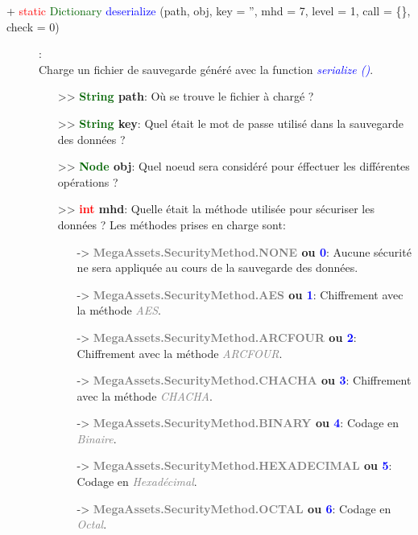 \documentclass[a4paper, 11pt]{article}
\begin{document}
	\begin{description}
		\item [+ \textcolor{red}{static} \textcolor{darkgreen}{Dictionary} \textcolor{blue}{deserialize} 
		(path, obj, key = '', mhd = 7, level = 1, call = \{\}, check = 0)]: \\Charge un fichier de
		sauvegarde généré avec la function \textit{\textcolor{blue}{\textit{serialize ()}}}.
		\begin{itemize}
			\item [>> \textbf{\textcolor{darkgreen}{String} path}:] Où se trouve le fichier à chargé ?
			\item [>> \textbf{\textcolor{darkgreen}{String} key}:] Quel était le mot de passe utilisé dans 
			la sauvegarde des données ?
			\item [>> \textbf{\textcolor{darkgreen}{Node} obj}:] Quel noeud sera considéré pour éffectuer
			les différentes opérations ?
			\item [>> \textbf{\textcolor{red}{int} mhd}:] Quelle était la méthode utilisée pour sécuriser 
			les données ? Les méthodes prises en charge sont:
			\begin{itemize}
				\item [-> \textbf{\textcolor{gray}{MegaAssets.SecurityMethod.NONE} ou \textcolor{blue}{0}}:] 
				Aucune sécurité ne sera appliquée au cours de la sauvegarde des données.
				\item [-> \textbf{\textcolor{gray}{MegaAssets.SecurityMethod.AES} ou \textcolor{blue}{1}}:] 
				Chiffrement avec la méthode \textit{\textcolor{gray}{AES}}.
				\item [-> \textbf{\textcolor{gray}{MegaAssets.SecurityMethod.ARCFOUR} ou \textcolor{blue}
				{2}}:] Chiffrement avec la méthode \textit{\textcolor{gray}{ARCFOUR}}.
				\item [-> \textbf{\textcolor{gray}{MegaAssets.SecurityMethod.CHACHA} ou \textcolor{blue}
				{3}}:] Chiffrement avec la méthode \textit{\textcolor{gray}{CHACHA}}.
				\item [-> \textbf{\textcolor{gray}{MegaAssets.SecurityMethod.BINARY} ou \textcolor{blue}
				{4}}:] Codage en \textit{\textcolor{gray}{Binaire}}.
				\item [-> \textbf{\textcolor{gray}{MegaAssets.SecurityMethod.HEXADECIMAL} ou 
				\textcolor{blue}{5}}:] Codage en \textit{\textcolor{gray}{Hexadécimal}}.
				\item [-> \textbf{\textcolor{gray}{MegaAssets.SecurityMethod.OCTAL} ou \textcolor{blue}
				{6}}:] Codage en \textit{\textcolor{gray}{Octal}}.

\end{itemize}
\end{itemize}
\end{description}
\end{document}

